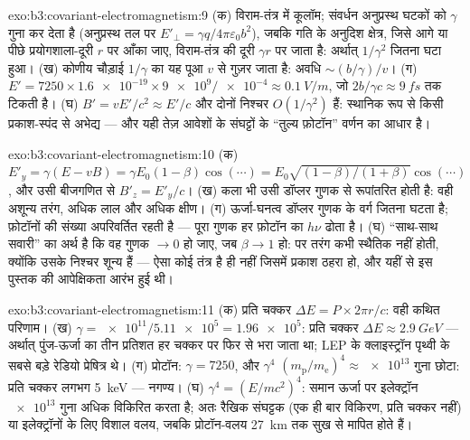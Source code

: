 \begin{solution}{exo:b3:covariant-electromagnetism:9}
(क) विराम-तंत्र में कूलॉम; संवर्धन अनुप्रस्थ घटकों को $\gamma$ गुना कर
देता है (अनुप्रस्थ तल पर $E'_\perp = \gamma
q/4\pi\varepsilon_0b^2$), जबकि गति के अनुदिश क्षेत्र, जिसे आगे या पीछे
प्रयोगशाला-दूरी $r$ पर आँका जाए, विराम-तंत्र की दूरी
$\gamma r$ पर जाता है: अर्थात् $1/\gamma^2$ जितना घटा हुआ। (ख) कोणीय चौड़ाई
$1/\gamma$ का यह पूआ $v$ से गुज़र जाता है: अवधि $\sim (b/\gamma)/v$। (ग)
$E' = 7250 \times \num{1.6e-19} \times \num{9e9}/\num{e-4} \approx
\qty{0.1}{V/m}$, जो $2b/\gamma c \approx \qty{9}{fs}$ तक टिकती है। (घ)
$B' = vE'/c^2 \approx E'/c$ और दोनों निश्चर $O(1/\gamma^2)$ हैं:
स्थानिक रूप से किसी प्रकाश-स्पंद से अभेद्य --- और यही तेज़ आवेशों के
संघट्टों के ``तुल्य फ़ोटॉन'' वर्णन का आधार है।
\end{solution}

\begin{solution}{exo:b3:covariant-electromagnetism:10}
(क) $E'_y = \gamma(E - vB) = \gamma E_0(1 - \beta)\cos(\cdots) =
E_0\sqrt{(1-\beta)/(1+\beta)}\cos(\cdots)$, और उसी बीजगणित से
$B'_z = E'_y/c$। (ख) कला भी उसी डॉप्लर
गुणक से रूपांतरित होती है: वही अशून्य तरंग, अधिक लाल और अधिक क्षीण।
(ग) ऊर्जा-घनत्व डॉप्लर गुणक के वर्ग जितना घटता है; फ़ोटॉनों की संख्या
अपरिवर्तित रहती है --- पूरा गुणक हर फ़ोटॉन का $h\nu$ ढोता है। (घ)
``साथ-साथ सवारी'' का अर्थ है कि वह गुणक $\to 0$ हो जाए, जब
$\beta \to 1$ हो: पर तरंग कभी स्थैतिक नहीं होती, क्योंकि उसके निश्चर
शून्य हैं --- ऐसा कोई तंत्र है ही नहीं जिसमें प्रकाश ठहरा हो, और
यहीं से इस पुस्तक की आपेक्षिकता आरंभ हुई थी।
\end{solution}

\begin{solution}{exo:b3:covariant-electromagnetism:11}
(क) प्रति चक्कर $\Delta E = P \times 2\pi r/c$: वही कथित परिणाम। (ख)
$\gamma = \num{e11}/\num{5.11e5} = \num{1.96e5}$: प्रति चक्कर $\Delta E \approx
\qty{2.9}{GeV}$ --- अर्थात् पुंज-ऊर्जा का तीन प्रतिशत हर चक्कर पर फिर
से भरा जाता था; LEP के क्लाइस्ट्रॉन पृथ्वी के सबसे बड़े रेडियो
प्रेषित्र थे। (ग) प्रोटॉन: $\gamma = 7250$, और $\gamma^4$
$(m_{\text{p}}/m_{\text{e}})^4 \approx \num{e13}$ गुना छोटा: प्रति
चक्कर लगभग \qty{5}{keV} --- नगण्य। (घ) $\gamma^4 = (E/mc^2)^4$:
समान ऊर्जा पर इलेक्ट्रॉन $\num{e13}$ गुना अधिक विकिरित करता है; अतः
रैखिक संघट्टक (एक ही बार विकिरण, प्रति चक्कर नहीं) या इलेक्ट्रॉनों के
लिए विशाल वलय, जबकि प्रोटॉन-वलय \qty{27}{km} तक सुख से मापित होते हैं।
\end{solution}

